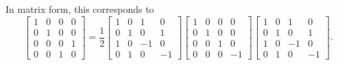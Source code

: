 In matrix form, this corresponds to $$\begin{bmatrix} 1 & 0 & 0 & 0 \\ 0 & 1 & 0 & 0 \\ 0 & 0 & 0 & 1 \\ 0 & 0 & 1 & 0 \end{bmatrix} = \frac{1}{2}\begin{bmatrix} 1 & 0 & 1 & 0 \\ 0 & 1 & 0 & 1 \\ 1 & 0 & -1 & 0 \\ 0 & 1 & 0 & -1\end{bmatrix}\begin{bmatrix} 1 & 0 & 0 &0 \\ 0 & 1 & 0 & 0 \\ 0 & 0 & 1 & 0 \\ 0 & 0 & 0 & -1\end{bmatrix}\begin{bmatrix} 1 & 0 & 1 & 0 \\ 0 & 1 & 0 & 1 \\ 1 & 0 & -1 & 0 \\ 0 & 1 & 0 & -1\end{bmatrix}.$$


